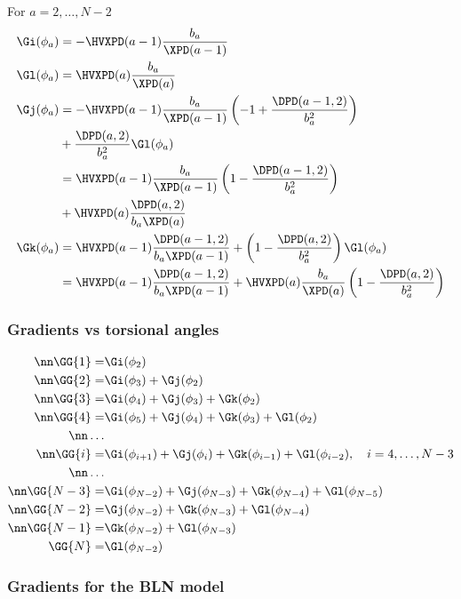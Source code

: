 For $a=2,\ldots,N-2$
\begin{align}
  \Gi(\phi_a)&=-\HVXPD(a-1)\frac{b_{a}}{\XPD(a-1)}  \\
  \Gl(\phi_a)&=\HVXPD(a)\frac{b_{a}}{\XPD(a)} \\
  \Gj(\phi_a)&=-\HVXPD(a-1)\frac{b_{a}}{\XPD(a-1)}
  \left(-1+\frac{\DPD(a-1,2)}{b_a^2}\right)\\
  &+\frac{\DPD(a,2)}{b_a^2}\Gl(\phi_a)\\
  &=\HVXPD(a-1)\frac{b_{a}}{\XPD(a-1)}\left(1-\frac{\DPD(a-1,2)}{b_a^2}\right)\\
  &+\HVXPD(a)\frac{\DPD(a,2)}{b_a\XPD(a)}\\
  \Gk(\phi_a)&=\HVXPD(a-1)\frac{\DPD(a-1,2)}{b_a\XPD(a-1)}+\left(1-\frac{\DPD(a,2)}{b_a^2}\right)\Gl(\phi_a)\\
  &=\HVXPD(a-1)\frac{\DPD(a-1,2)}{b_a\XPD(a-1)}+
  \HVXPD(a)\frac{b_{a}}{\XPD(a)}\left(1-\frac{\DPD(a,2)}{b_a^2}\right)
\end{align}

\clearpage
\subsubsection{Gradients vs torsional angles}

\begin{align}
  \nn\GG{1}=&\Gi(\phi_2)\\
  \nn\GG{2}=&\Gi(\phi_3)+\Gj(\phi_2)\\
  \nn\GG{3}=&\Gi(\phi_4)+\Gj(\phi_3)+\Gk(\phi_2)\\
  \nn\GG{4}=&\Gi(\phi_5)+\Gj(\phi_4)+\Gk(\phi_3)+\Gl(\phi_2)\\
  \nn\ldots\\
  \nn\GG{i}=&\Gi(\phi_{i+1})+\Gj(\phi_i)+\Gk(\phi_{i-1})+\Gl(\phi_{i-2}),\quad i=4,\ldots,N-3\\
  \nn\ldots\\
  \nn\GG{N-3}=&\Gi(\phi_{N-2})+\Gj(\phi_{N-3})+\Gk(\phi_{N-4})+\Gl(\phi_{N-5})\\
  \nn\GG{N-2}=&\Gj(\phi_{N-2})+\Gk(\phi_{N-3})+\Gl(\phi_{N-4})\\
  \nn\GG{N-1}=&\Gk(\phi_{N-2})+\Gl(\phi_{N-3})\\
  \GG{N}=&\Gl(\phi_{N-2})
\end{align}

\subsubsection{Gradients for the BLN model}

